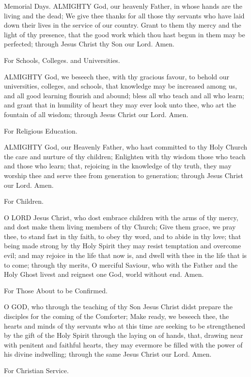  
 
Memorial Days.
ALMIGHTY God, our heavenly Father, in whose hands are the living and the dead; We give thee thanks for all those thy servants who have laid down their lives in the service of our country. Grant to them thy mercy and the light of thy presence, that the good work which thou hast begun in them may be perfected; through Jesus Christ thy Son our Lord. Amen.

For Schools, Colleges. and Universities.

ALMIGHTY God, we beseech thee, with thy gracious favour, to behold our universities, colleges, and schools, that knowledge may be increased among us, and all good learning flourish and abound; bless all who teach and all who learn; and grant that in humility of heart they may ever look unto thee, who art the fountain of all wisdom; through Jesus Christ our Lord. Amen.

For Religious Education.

ALMIGHTY God, our Heavenly Father, who hast committed to thy Holy Church the care and nurture of thy children; Enlighten with thy wisdom those who teach and those who learn; that, rejoicing in the knowledge of thy truth, they may worship thee and serve thee from generation to generation; through Jesus Christ our Lord. Amen.

For Children.

O LORD Jesus Christ, who dost embrace children with the arms of thy mercy, and dost make them living members of thy Church; Give them grace, we pray thee, to stand fast in thy faith, to obey thy word, and to abide in thy love; that being made strong by thy Holy Spirit they may resist temptation and overcome evil; and may rejoice in the life that now is, and dwell with thee in the life that is to come; through thy merits, O merciful Saviour, who with the Father and the Holy Ghost livest and reignest one God, world without end. Amen.

For Those About to be Confirmed.

O GOD, who through the teaching of thy Son Jesus Christ didst prepare the disciples for the coming of the Comforter; Make ready, we beseech thee, the hearts and minds of thy servants who at this time are seeking to be strengthened by the gift of the Holy Spirit through the laying on of hands, that, drawing near with penitent and faithful hearts, they may evermore be filled with the power of his divine indwelling; through the same Jesus Christ our Lord. Amen.

For Christian Service.

